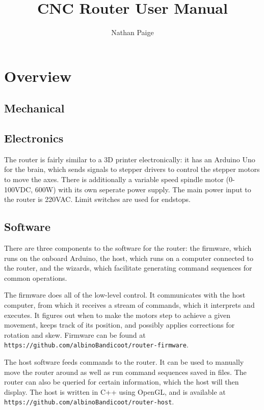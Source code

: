 \documentclass[a4paper,11pt]{article}
\title{CNC Router User Manual}
\author{Nathan Paige}
\begin{document}
\maketitle

\section{Overview}

\subsection{Mechanical}

\subsection{Electronics}
The router is fairly similar to a 3D printer electronically: it has an Arduino Uno for the brain, which sends signals to stepper drivers to control the stepper motors to move the axes. There is additionally a variable speed spindle motor (0-100VDC, 600W) with its own seperate power supply. The main power input to the router is 220VAC. Limit switches are used for endstops.

\subsection{Software}
There are three components to the software for the router: the firmware, which runs on the onboard Arduino, the host, which runs on a computer connected to the router, and the wizards, which facilitate generating command sequences for common operations.

The firmware does all of the low-level control. It communicates with the host computer, from which it receives a stream of commands, which it interprets and executes. It figures out when to make the motors step to achieve a given movement, keeps track of its position, and possibly applies corrections for rotation and skew. Firmware can be found at \texttt{https://github.com/albinoBandicoot/router-firmware}.

The host software feeds commands to the router. It can be used to manually move the router around as well as run command sequences saved in files. The router can also be queried for certain information, which the host will then display. The host is written in C++ using OpenGL, and is available at \texttt{https://github.com/albinoBandicoot/router-host}.
\end{document}

